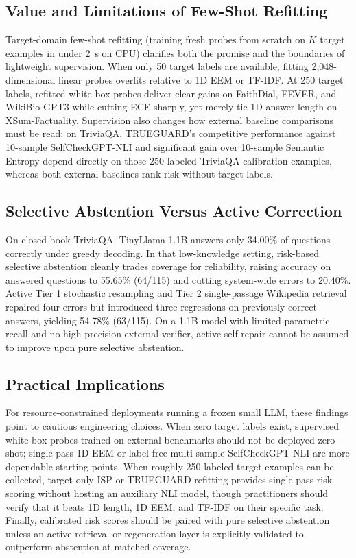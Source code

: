 \documentclass{ieeeaccess}
\begin{document}
\subsection{Value and Limitations of Few-Shot Refitting}
Target-domain few-shot refitting (training fresh probes from scratch on $K$ target examples in under 2~s on CPU) clarifies both the promise and the boundaries of lightweight supervision. When only 50 target labels are available, fitting 2,048-dimensional linear probes overfits relative to 1D EEM or TF-IDF. At 250 target labels, refitted white-box probes deliver clear gains on FaithDial, FEVER, and WikiBio-GPT3 while cutting ECE sharply, yet merely tie 1D answer length on XSum-Factuality. Supervision also changes how external baseline comparisons must be read: on TriviaQA, TRUEGUARD's competitive performance against 10-sample SelfCheckGPT-NLI and significant gain over 10-sample Semantic Entropy depend directly on those 250 labeled TriviaQA calibration examples, whereas both external baselines rank risk without target labels.

\subsection{Selective Abstention Versus Active Correction}
On closed-book TriviaQA, TinyLlama-1.1B answers only 34.00\% of questions correctly under greedy decoding. In that low-knowledge setting, risk-based selective abstention cleanly trades coverage for reliability, raising accuracy on answered questions to 55.65\% (64/115) and cutting system-wide errors to 20.40\%. Active Tier 1 stochastic resampling and Tier 2 single-passage Wikipedia retrieval repaired four errors but introduced three regressions on previously correct answers, yielding 54.78\% (63/115). On a 1.1B model with limited parametric recall and no high-precision external verifier, active self-repair cannot be assumed to improve upon pure selective abstention.

\subsection{Practical Implications}
For resource-constrained deployments running a frozen small LLM, these findings point to cautious engineering choices. When zero target labels exist, supervised white-box probes trained on external benchmarks should not be deployed zero-shot; single-pass 1D EEM or label-free multi-sample SelfCheckGPT-NLI are more dependable starting points. When roughly 250 labeled target examples can be collected, target-only ISP or TRUEGUARD refitting provides single-pass risk scoring without hosting an auxiliary NLI model, though practitioners should verify that it beats 1D length, 1D EEM, and TF-IDF on their specific task. Finally, calibrated risk scores should be paired with pure selective abstention unless an active retrieval or regeneration layer is explicitly validated to outperform abstention at matched coverage.
\end{document}
